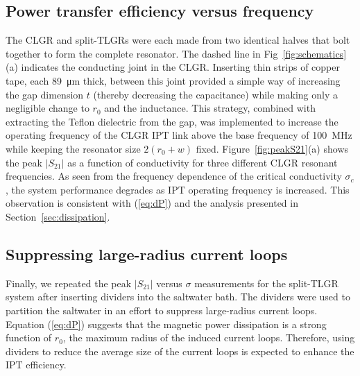 \documentclass[conference]{IEEEtran}
\begin{document}
\subsection{Power transfer efficiency versus frequency}\label{sub:divide}
The CLGR and split-TLGRs were each made from two identical halves that bolt together to form the complete resonator.  The dashed line in Fig~\ref{fig:schematics}(a) indicates the conducting joint in the CLGR.   Inserting thin strips of copper tape, each \SI{89}{\micro\meter} thick,  between this joint provided a simple way of increasing the gap dimension $t$ (thereby decreasing the capacitance) while making only a negligible change to $r_0$ and the inductance.  This strategy, combined with extracting the Teflon dielectric from the gap, was implemented to increase the operating frequency of the CLGR IPT link above the base frequency of \SI{100}{\mega\hertz} while keeping the resonator size $2\left(r_0+w\right)$ fixed.  Figure~\ref{fig:peakS21}(a) shows the peak $\left\vert S_{21}\right\vert$ as a function of conductivity for three different CLGR resonant frequencies.  As seen from the frequency dependence of the critical conductivity $\sigma_c$, the system performance degrades as IPT operating frequency is increased.  This observation is consistent with (\ref{eq:dP}) and the analysis presented in Section~\ref{sec:dissipation}.   

\subsection{Suppressing large-radius current loops}
Finally, we repeated the peak $\left\vert S_{21}\right\vert$ versus $\sigma$ measurements for the split-TLGR system after inserting dividers into the saltwater bath.  The dividers were used to partition the saltwater in an effort to suppress large-radius current loops.  Equation (\ref{eq:dP}) suggests that the magnetic power dissipation is a strong function of $r_0$, the maximum radius of the induced current loops.  Therefore, using dividers to reduce the average size of the current loops is expected to enhance the IPT efficiency.
\end{document}

